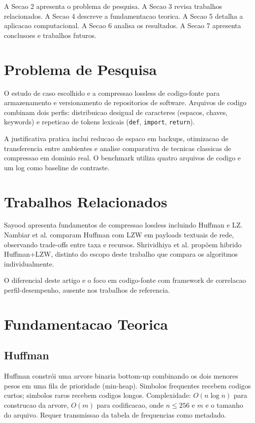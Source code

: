\documentclass[12pt]{article}
\begin{document}
A Secao 2 apresenta o problema de pesquisa. A Secao 3 revisa trabalhos relacionados. A Secao 4 descreve a fundamentacao teorica. A Secao 5 detalha a aplicacao computacional. A Secao 6 analisa os resultados. A Secao 7 apresenta conclusoes e trabalhos futuros.

\section{Problema de Pesquisa}

O estudo de caso escolhido e a compressao lossless de codigo-fonte para armazenamento e versionamento de repositorios de software. Arquivos de codigo combinam dois perfis: distribuicao desigual de caracteres (espacos, chaves, keywords) e repeticao de tokens lexicais (\texttt{def}, \texttt{import}, \texttt{return}).

A justificativa pratica inclui reducao de espaco em backups, otimizacao de transferencia entre ambientes e analise comparativa de tecnicas classicas de compressao em dominio real. O benchmark utiliza quatro arquivos de codigo e um log como baseline de contraste.

\section{Trabalhos Relacionados}

Sayood \cite{sayood2017} apresenta fundamentos de compressao lossless incluindo Huffman e LZ. Nambiar et al. \cite{nambiar2025} comparam Huffman com LZW em payloads textuais de rede, observando trade-offs entre taxa e recursos. Shrividhiya et al. \cite{shrividhiya2021} propõem hibrido Huffman+LZW, distinto do escopo deste trabalho que compara os algoritmos individualmente.

O diferencial deste artigo e o foco em codigo-fonte com framework de correlacao perfil-desempenho, ausente nos trabalhos de referencia.

\section{Fundamentacao Teorica}

\subsection{Huffman}

Huffman constrói uma arvore binaria bottom-up combinando os dois menores pesos em uma fila de prioridade (min-heap). Simbolos frequentes recebem codigos curtos; simbolos raros recebem codigos longos. Complexidade: $O(n \log n)$ para construcao da arvore, $O(m)$ para codificacao, onde $n \leq 256$ e $m$ e o tamanho do arquivo. Requer transmissao da tabela de frequencias como metadado.
\end{document}
